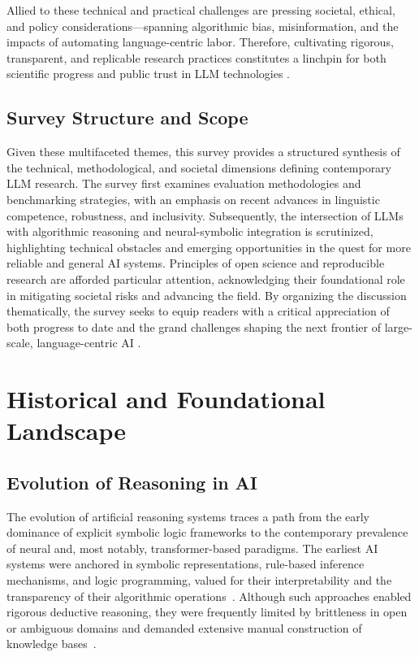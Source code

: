 Allied to these technical and practical challenges are pressing societal, ethical, and policy considerations—spanning algorithmic bias, misinformation, and the impacts of automating language-centric labor. Therefore, cultivating rigorous, transparent, and replicable research practices constitutes a linchpin for both scientific progress and public trust in LLM technologies \cite{ref42,ref54,ref86}.

\subsection{Survey Structure and Scope}

Given these multifaceted themes, this survey provides a structured synthesis of the technical, methodological, and societal dimensions defining contemporary LLM research. The survey first examines evaluation methodologies and benchmarking strategies, with an emphasis on recent advances in linguistic competence, robustness, and inclusivity. Subsequently, the intersection of LLMs with algorithmic reasoning and neural-symbolic integration is scrutinized, highlighting technical obstacles and emerging opportunities in the quest for more reliable and general AI systems. Principles of open science and reproducible research are afforded particular attention, acknowledging their foundational role in mitigating societal risks and advancing the field. By organizing the discussion thematically, the survey seeks to equip readers with a critical appreciation of both progress to date and the grand challenges shaping the next frontier of large-scale, language-centric AI \cite{ref42,ref49,ref54,ref86}.

\section{Historical and Foundational Landscape}

\subsection{Evolution of Reasoning in AI}

The evolution of artificial reasoning systems traces a path from the early dominance of explicit symbolic logic frameworks to the contemporary prevalence of neural and, most notably, transformer-based paradigms. The earliest AI systems were anchored in symbolic representations, rule-based inference mechanisms, and logic programming, valued for their interpretability and the transparency of their algorithmic operations~\cite{ref42,ref49,ref54,ref86}. Although such approaches enabled rigorous deductive reasoning, they were frequently limited by brittleness in open or ambiguous domains and demanded extensive manual construction of knowledge bases~\cite{ref86}.

